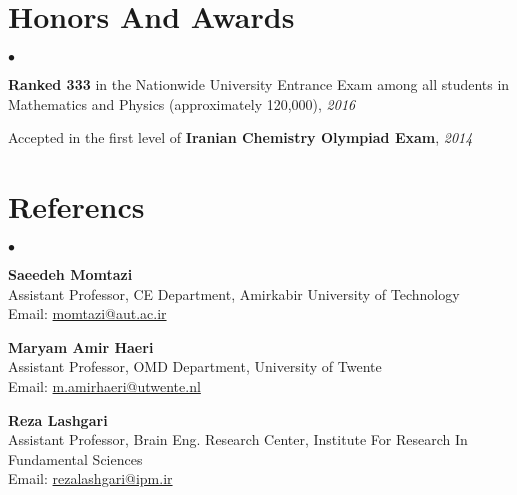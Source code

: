 \documentclass[margin,line]{res}
\newenvironment{list2}{
\begin{list}{$\bullet$}{
		\setlength{\itemsep}{0in}
		\setlength{\parsep}{0in} \setlength{\parskip}{0in}
		\setlength{\topsep}{0in} \setlength{\partopsep}{0in} 
		\setlength{\leftmargin}{0.2in}}}{\end{list}}
\begin{document}
\begin{resume}
	\section{\sc Honors And Awards}
	\begin{list2}
		\item \textbf{Ranked 333} in the Nationwide University Entrance Exam among all students
		in Mathematics and Physics (approximately 120,000), \textit{2016}
		\item Accepted in the first level of \textbf{Iranian Chemistry Olympiad Exam}, \textit{2014}
	\end{list2}
	
	
	\section{\sc Referencs} 
	\begin{list2}
		\item{\textbf{Saeedeh Momtazi}} \\
		Assistant Professor, CE Department, Amirkabir University of Technology \\
		Email: \href{mailto:momtazi@aut.ac.ir}{momtazi@aut.ac.ir}
		\item{\textbf{Maryam Amir Haeri}} \\
		Assistant Professor, OMD Department, University of Twente \\
		Email: \href{mailto:m.amirhaeri@utwente.nl}{m.amirhaeri@utwente.nl}
		\item{\textbf{Reza Lashgari}} \\
		Assistant Professor, Brain Eng. Research Center, Institute For Research In Fundamental Sciences\\
		Email: \href{mailto:rezalashgari@ipm.ir}{rezalashgari@ipm.ir}
	\end{list2} 
	
\end{resume}
\end{document}
